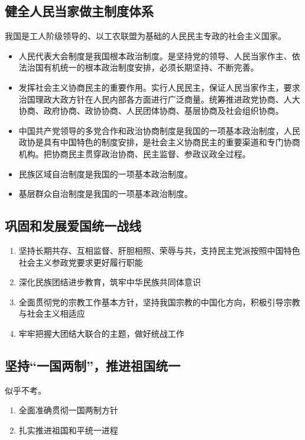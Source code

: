     \subsection{健全人民当家做主制度体系}
        我国是工人阶级领导的、以工农联盟为基础的人民民主专政的社会主义国家。
        \begin{itemize}
            \item 人民代表大会制度是我国根本政治制度。是坚持党的领导、人民当家作主、依法治国有机统一的根本政治制度安排，必须长期坚持、不断完善。
            \item 发挥社会主义协商民主的重要作用。实行人民民主，保证人民当家作主，要求治国理政大政方针在人民内部各方面进行广泛商量。统筹推进政党协商、人大协商、政府协商、政协协商、人民团体协商、基层协商及社会组织协商。
            \item 中国共产党领导的多党合作和政治协商制度是我国的一项基本政治制度，人民政协是具有中国特色的制度安排，是社会主义协商民主的重要渠道和专门协商机构。把协商民主贯穿政治协商、民主监督、参政议政全过程。
            \item 民族区域自治制度是我国的一项基本政治制度。
            \item 基层群众自治制度是我国的一项基本政治制度。
        \end{itemize}

    \subsection{巩固和发展爱国统一战线}
        \begin{enumerate}
            \item 坚持长期共存、互相监督、肝胆相照、荣辱与共，支持民主党派按照中国特色社会主义参政党要求更好履行职能
            \item 深化民族团结进步教育，筑牢中华民族共同体意识
            \item 全面贯彻党的宗教工作基本方针，坚持我国宗教的中国化方向，积极引导宗教与社会主义相适应
            \item 牢牢把握大团结大联合的主题，做好统战工作
        \end{enumerate}

    \subsection{坚持“一国两制”，推进祖国统一}
        似乎不考。
        \begin{enumerate}
            \item 全面准确贯彻一国两制方针
            \item 扎实推进祖国和平统一进程
        \end{enumerate}


